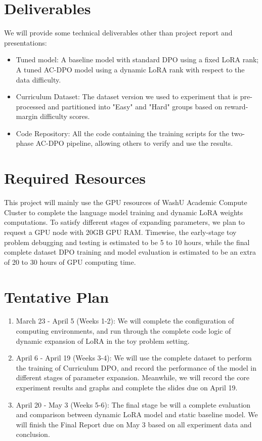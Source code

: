 \documentclass{article}
\begin{document}
\section{Deliverables}
We will provide some technical deliverables other than project report and presentations:
\begin{itemize}
    \item Tuned model: A baseline model with standard DPO using a fixed LoRA rank; A tuned AC-DPO model using a dynamic LoRA rank with respect to the data difficulty.
    \item Curriculum Dataset: The dataset version we used to experiment that is pre-processed and partitioned into "Easy" and "Hard" groups based on reward-margin difficulty scores.
    \item Code Repository: All the code containing the training scripts for the two-phase AC-DPO pipeline, allowing others to verify and use the results.
    
\end{itemize}

\section{Required Resources}
This project will mainly use the GPU resources of WashU Academic Compute Cluster to complete the language model training and dynamic LoRA weights computations. To satisfy different stages of expanding parameters, we plan to request a GPU node with 20GB GPU RAM. Timewise, the early-stage toy problem debugging and testing is estimated to be 5 to 10 hours, while the final complete dataset DPO training and model evaluation is estimated to be an extra of 20 to 30 hours of GPU computing time.

\section{Tentative Plan}

\begin{enumerate}
    \item March 23 - April 5 (Weeks 1-2):
    We will complete the configuration of computing environments, and run through the complete code logic of dynamic expansion of LoRA in the toy problem setting.
    \item April 6 - April 19 (Weeks 3-4):
    We will use the complete dataset to perform the training of Curriculum DPO, and record the performance of the model in different stages of parameter expansion. Meanwhile, we will record the core experiment results and graphs and complete the slides due on April 19.
    \item April 20 - May 3 (Weeks 5-6):
    The final stage be will a complete evaluation and comparison between dynamic LoRA model and static baseline model. We will finish the Final Report due on May 3 based on all experiment data and conclusion.
\end{enumerate}
\end{document}
